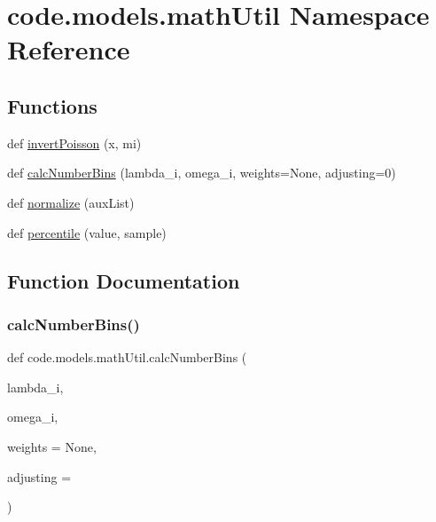 \hypertarget{namespacecode_1_1models_1_1math_util}{}\section{code.\+models.\+math\+Util Namespace Reference}
\label{namespacecode_1_1models_1_1math_util}
\subsection*{Functions}
\begin{DoxyCompactItemize}
\item 
def \hyperlink{namespacecode_1_1models_1_1math_util_ac0f6efe45f2da086c1225392a228983e}{invert\+Poisson} (x, mi)
\item 
def \hyperlink{namespacecode_1_1models_1_1math_util_ac76d9979aa6ab0cd5be96f5935939528}{calc\+Number\+Bins} (lambda\+\_\+i, omega\+\_\+i, weights=None, adjusting=0)
\item 
def \hyperlink{namespacecode_1_1models_1_1math_util_aaef089b43b3c89bcacb91765ef2b878a}{normalize} (aux\+List)
\item 
def \hyperlink{namespacecode_1_1models_1_1math_util_a2415ab497b8fa691c2755ca022d77c48}{percentile} (value, sample)
\end{DoxyCompactItemize}


\subsection{Function Documentation}
\mbox{\label{namespacecode_1_1models_1_1math_util_ac76d9979aa6ab0cd5be96f5935939528}} 
\subsubsection{\texorpdfstring{calc\+Number\+Bins()}{calcNumberBins()}}
{\footnotesize\ttfamily def code.\+models.\+math\+Util.\+calc\+Number\+Bins (\begin{DoxyParamCaption}\item[{}]{lambda\+\_\+i,  }\item[{}]{omega\+\_\+i,  }\item[{}]{weights = {\ttfamily None},  }\item[{}]{adjusting = {} }\end{DoxyParamCaption})}

